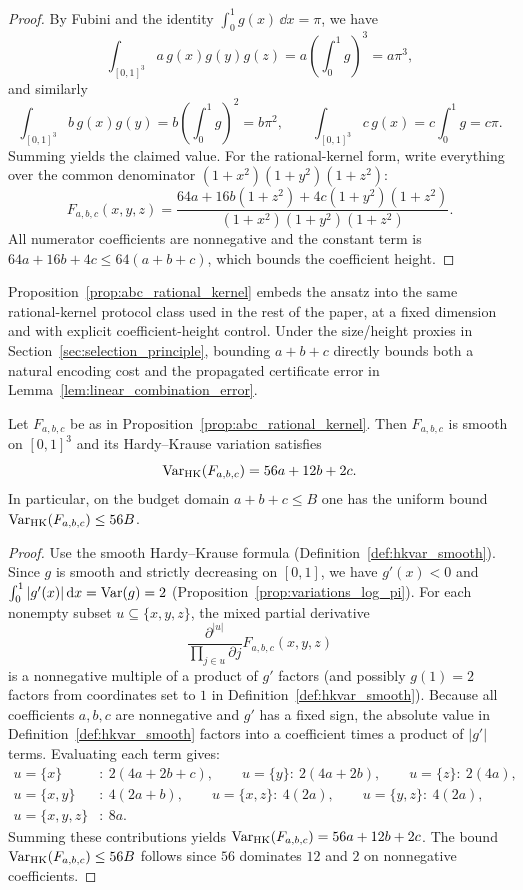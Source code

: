 \begin{proof}
By Fubini and the identity $\int_0^1 g(x)\,\dd x=\pi$, we have
\[
\int_{[0,1]^3} a\,g(x)g(y)g(z)=a\left(\int_0^1 g\right)^3=a\pi^3,
\]
and similarly
\[
\int_{[0,1]^3} b\,g(x)g(y)=b\left(\int_0^1 g\right)^2=b\pi^2,\qquad
\int_{[0,1]^3} c\,g(x)=c\int_0^1 g=c\pi.
\]
Summing yields the claimed value.
For the rational-kernel form, write everything over the common denominator $(1+x^2)(1+y^2)(1+z^2)$:
\[
F_{a,b,c}(x,y,z)=\frac{64a+16b(1+z^2)+4c(1+y^2)(1+z^2)}{(1+x^2)(1+y^2)(1+z^2)}.
\]
All numerator coefficients are nonnegative and the constant term is $64a+16b+4c\le 64(a+b+c)$, which bounds the coefficient height.
\end{proof}

\begin{remark}
Proposition~\ref{prop:abc_rational_kernel} embeds the ansatz into the same rational-kernel protocol class used in the rest of the paper, at a fixed dimension and with explicit coefficient-height control.
Under the size/height proxies in Section~\ref{sec:selection_principle}, bounding $a+b+c$ directly bounds both a natural encoding cost and the propagated certificate error in Lemma~\ref{lem:linear_combination_error}.
\end{remark}

\begin{proposition}
\label{prop:hkvar_abc_kernel}
Let $F_{a,b,c}$ be as in Proposition~\ref{prop:abc_rational_kernel}.
Then $F_{a,b,c}$ is smooth on $[0,1]^3$ and its Hardy--Krause variation satisfies
\[
\mathrm{Var}_{\mathrm{HK}}(F_{a,b,c})=56a+12b+2c.
\]
In particular, on the budget domain $a+b+c\le B$ one has the uniform bound $\mathrm{Var}_{\mathrm{HK}}(F_{a,b,c})\le 56B$.
\end{proposition}

\begin{proof}
Use the smooth Hardy--Krause formula (Definition~\ref{def:hkvar_smooth}).
Since $g$ is smooth and strictly decreasing on $[0,1]$, we have $g'(x)<0$ and $\int_0^1 |g'(x)|\,\mathrm{d} x=\mathrm{Var}(g)=2$ (Proposition~\ref{prop:variations_log_pi}).
For each nonempty subset $u\subseteq\{x,y,z\}$, the mixed partial derivative
\[
\frac{\partial^{|u|}}{\prod_{j\in u}\partial j}F_{a,b,c}(x,y,z)
\]
is a nonnegative multiple of a product of $g'$ factors (and possibly $g(1)=2$ factors from coordinates set to $1$ in Definition~\ref{def:hkvar_smooth}).
Because all coefficients $a,b,c$ are nonnegative and $g'$ has a fixed sign, the absolute value in Definition~\ref{def:hkvar_smooth} factors into a coefficient times a product of $|g'|$ terms.
Evaluating each term gives:
\[
\begin{aligned}
u=\{x\}&:\ 2(4a+2b+c),\qquad
u=\{y\}:\ 2(4a+2b),\qquad
u=\{z\}:\ 2(4a),\\
u=\{x,y\}&:\ 4(2a+b),\qquad
u=\{x,z\}:\ 4(2a),\qquad
u=\{y,z\}:\ 4(2a),\\
u=\{x,y,z\}&:\ 8a.
\end{aligned}
\]
Summing these contributions yields $\mathrm{Var}_{\mathrm{HK}}(F_{a,b,c})=56a+12b+2c$.
The bound $\mathrm{Var}_{\mathrm{HK}}(F_{a,b,c})\le 56B$ follows since $56$ dominates $12$ and $2$ on nonnegative coefficients.
\end{proof}

